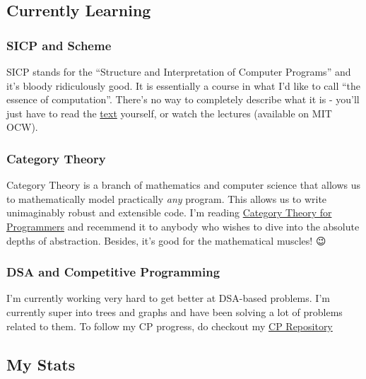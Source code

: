 \documentclass[]{tufte-handout}
\begin{document}
\hypertarget{currently-learning}{%
\subsection{Currently Learning 🌱}\label{currently-learning}}

\hypertarget{sicp-and-scheme}{%
\subsubsection{SICP and Scheme}\label{sicp-and-scheme}}

SICP stands for the ``Structure and Interpretation of Computer
Programs'' and it's bloody ridiculously good. It is essentially a course
in what I'd like to call ``the essence of computation''. There's no way
to completely describe what it is - you'll just have to read the
\href{https://web.mit.edu/6.001/6.037/sicp.pdf}{text} yourself, or watch
the lectures (available on MIT OCW).

\hypertarget{category-theory}{%
\subsubsection{Category Theory}\label{category-theory}}

Category Theory is a branch of mathematics and computer science that
allows us to mathematically model practically \emph{any} program. This
allows us to write unimaginably robust and extensible code. I'm reading
\href{https://github.com/hmemcpy/milewski-ctfp-pdf/}{Category Theory for
Programmers} and recemmend it to anybody who wishes to dive into the
absolute depths of abstraction. Besides, it's good for the mathematical
muscles! 😉

\hypertarget{dsa-and-competitive-programming}{%
\subsubsection{DSA and Competitive
Programming}\label{dsa-and-competitive-programming}}

I'm currently working very hard to get better at DSA-based problems. I'm
currently super into trees and graphs and have been solving a lot of
problems related to them. To follow my CP progress, do checkout my
\href{https://github.com/rahulc29/cp}{CP Repository}

\hypertarget{my-stats}{%
\subsection{My Stats}\label{my-stats}}
\end{document}
